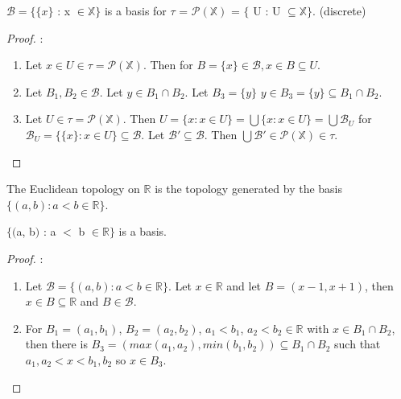 \documentclass{article}
\begin{document}
	\begin{theorem}
	$\mathcal{B} = \lbrace\lbrace x \rbrace$ : x $\in \mathbb{X}\rbrace$ is a basis for $\tau$ = $\mathcal{P}(\mathbb{X})$ = $\lbrace$ U : U $\subseteq \mathbb{X} \rbrace$. (discrete)
	\end{theorem}
	\begin{proof}:\newline
		\begin{enumerate}
			\item Let $x \in U \in \tau = \mathcal{P}(\mathbb{X})$. Then for $B = \lbrace x \rbrace \in \mathcal{B}, x \in B \subseteq U$.
			\item Let $B_1, B_2 \in \mathcal{B}$. Let $y \in B_1 \cap B_2$. Let $B_3 = \lbrace y \rbrace$ $y \in B_3 = \lbrace y \rbrace \subseteq B_1 \cap B_2$. 
			\item Let $U \in \tau = \mathcal{P} ( \mathbb{X} )$. Then $U = \lbrace x : x \in U \rbrace = \bigcup \lbrace x : x \in U \rbrace = \bigcup \mathcal{B}_U$ for $\mathcal{B}_U = \lbrace \lbrace x \rbrace : x \in U \rbrace \subseteq \mathcal{B}$.
			\newline Let $\mathcal{B'} \subseteq \mathcal{B}$. Then $\bigcup \mathcal{B'} \in \mathcal{P}(\mathbb{X}) \in \tau$.
		\end{enumerate}
	\end{proof}

	\begin{definition}
	The Euclidean topology on $\mathbb{R}$ is the topology generated by the basis \newline $\lbrace(a, b) : a < b \in \mathbb{R}\rbrace$.
	\end{definition}

	\begin{theorem}
	$\lbrace($a, b$)$ : a $<$ b $\in \mathbb{R}\rbrace$ is a basis.
	\end{theorem}
	\begin{proof}:\newline
		\begin{enumerate}
			\item Let $\mathcal{B} = \lbrace (a, b) : a < b \in \mathbb{R} \rbrace$. Let $x \in \mathbb{R}$ and let $B = (x-1, x+1)$, then $x \in B \subseteq \mathbb{R}$ and $B \in \mathcal{B}$.	
			\item For $B_1 = (a_1, b_1)$, $B_2 = (a_2, b_2)$, $a_1<b_1$, $a_2<b_2 \in \mathbb{R}$ with $x \in B_1 \cap B_2$, then there is $B_3 = ( max(a_1, a_2), min(b_1, b_2) ) \subseteq B_1 \cap B_2$ such that $a_1,a_2<x<b_1,b_2$ so $ x \in B_3$.
		\end{enumerate}
	\end{proof}
\end{document}
